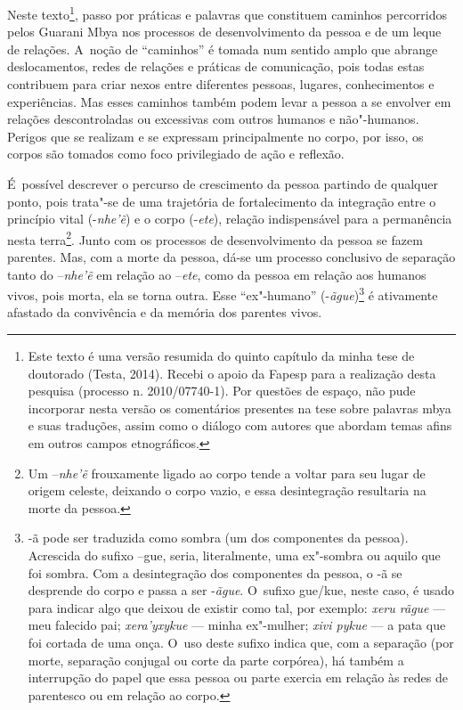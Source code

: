 \noindent
Neste texto\footnote{Este texto é uma versão resumida do quinto capítulo
da minha tese de doutorado (Testa, 2014). Recebi o apoio da Fapesp para
a realização desta pesquisa (processo n. 2010/07740-1). Por questões de
espaço, não pude incorporar nesta versão os comentários presentes na
tese sobre palavras mbya e suas traduções, assim como o diálogo com
autores que abordam temas afins em outros campos etnográficos.}, passo
por práticas e palavras que constituem caminhos percorridos pelos
Guarani Mbya nos processos de desenvolvimento da pessoa e de um leque
de relações. A~noção de ``caminhos'' é tomada num sentido amplo que abrange
deslocamentos, redes de relações e práticas de comunicação, pois todas
estas contribuem para criar nexos entre diferentes pessoas, lugares,
conhecimentos e experiências. Mas esses caminhos também podem levar a
pessoa a se envolver em relações descontroladas ou excessivas com
outros humanos e não"-humanos. Perigos que se realizam e se expressam
principalmente no corpo, por isso, os corpos são tomados como foco
privilegiado de ação e reflexão.

É~possível descrever o percurso de crescimento da pessoa partindo de
qualquer ponto, pois trata"-se de uma trajetória de fortalecimento da
integração entre o princípio vital (-\emph{nhe’ẽ}) e o corpo (-\emph{ete}),
relação indispensável para a permanência nesta terra\footnote{Um
–\emph{nhe’ẽ} frouxamente ligado ao corpo tende a voltar para seu lugar
de origem celeste, deixando o corpo vazio, e essa desintegração
resultaria na morte da pessoa.}. Junto com os processos de
desenvolvimento da pessoa se fazem parentes. Mas, com a morte da
pessoa, dá-se um processo conclusivo de separação tanto do –\emph{nhe’ẽ}
em relação ao –\emph{ete}, como da pessoa em relação aos humanos vivos, pois
morta, ela se torna outra. Esse ``ex"-humano'' (-\emph{ãgue})\footnote{-ã pode
ser traduzida como sombra (um dos componentes da pessoa). Acrescida do
sufixo –gue, seria, literalmente, uma ex"-sombra ou aquilo que foi
sombra. Com a desintegração dos componentes da pessoa, o -ã se
desprende do corpo e passa a ser -\emph{ãgue}. O~sufixo gue/kue, neste caso, é
usado para indicar algo que deixou de existir como tal, por exemplo:
\emph{xeru rãgue} --- meu falecido pai; \emph{xera’yxykue} --- minha ex"-mulher; \emph{xivi
pykue} --- a pata que foi cortada de uma onça. O~uso deste sufixo indica
que, com a separação (por morte, separação conjugal ou corte da parte
corpórea), há também a interrupção do papel que essa pessoa ou parte
exercia em relação às redes de parentesco ou em relação ao corpo.} é
ativamente afastado da convivência e da memória dos parentes vivos. 

